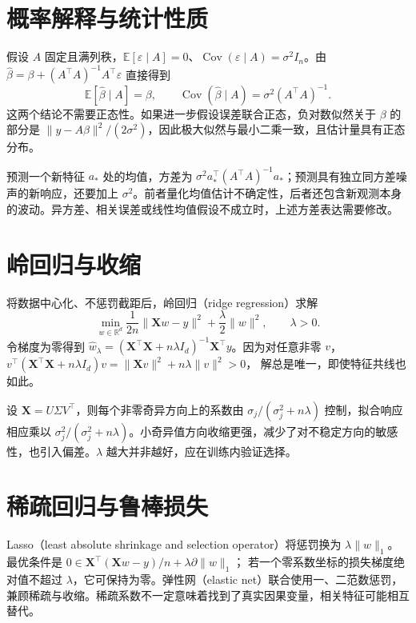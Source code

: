 \documentclass[UTF8,12pt,a4paper,fontset=fandol]{ctexbook}
\begin{document}
\section{概率解释与统计性质}

假设 $A$ 固定且满列秩，$\mathbb E[\varepsilon\mid A]=0$、$\operatorname{Cov}(\varepsilon\mid A)=\sigma^2I_n$。由
$\widehat\beta=\beta+(A^\top A)^{-1}A^\top\varepsilon$
直接得到
\[
 \mathbb E[\widehat\beta\mid A]=\beta,\qquad
 \operatorname{Cov}(\widehat\beta\mid A)=\sigma^2(A^\top A)^{-1}.
\]
这两个结论不需要正态性。如果进一步假设误差联合正态，负对数似然关于 $\beta$ 的部分是 $\|y-A\beta\|^2/(2\sigma^2)$，因此极大似然与最小二乘一致，且估计量具有正态分布。

预测一个新特征 $a_*$ 处的均值，方差为 $\sigma^2a_*^\top(A^\top A)^{-1}a_*$；预测具有独立同方差噪声的新响应，还要加上 $\sigma^2$。前者量化均值估计不确定性，后者还包含新观测本身的波动。异方差、相关误差或线性均值假设不成立时，上述方差表达需要修改。

\section{岭回归与收缩}

将数据中心化、不惩罚截距后，岭回归（ridge regression）求解
\begin{equation}
 \min_{w\in\mathbb R^d}\frac1{2n}\|\mathbf Xw-y\|^2
   +\frac\lambda2\|w\|^2,\qquad\lambda>0.
 \label{eq:ml-ridge}
\end{equation}
令梯度为零得到 $\widehat w_\lambda=(\mathbf X^\top\mathbf X+n\lambda I_d)^{-1}\mathbf X^\top y$。因为对任意非零 $v$，
$v^\top(\mathbf X^\top\mathbf X+n\lambda I_d)v=\|\mathbf Xv\|^2+n\lambda\|v\|^2>0$，
解总是唯一，即使特征共线也如此。

设 $\mathbf X=U\Sigma V^\top$，则每个非零奇异方向上的系数由 $\sigma_j/(\sigma_j^2+n\lambda)$ 控制，拟合响应相应乘以 $\sigma_j^2/(\sigma_j^2+n\lambda)$。小奇异值方向收缩更强，减少了对不稳定方向的敏感性，也引入偏差。$\lambda$ 越大并非越好，应在训练内验证选择。

\section{稀疏回归与鲁棒损失}

Lasso（least absolute shrinkage and selection operator）将惩罚换为 $\lambda\|w\|_1$。最优条件是
$0\in\mathbf X^\top(\mathbf Xw-y)/n+\lambda\partial\|w\|_1$；
若一个零系数坐标的损失梯度绝对值不超过 $\lambda$，它可保持为零。弹性网（elastic net）联合使用一、二范数惩罚，兼顾稀疏与收缩。稀疏系数不一定意味着找到了真实因果变量，相关特征可能相互替代。
\end{document}
